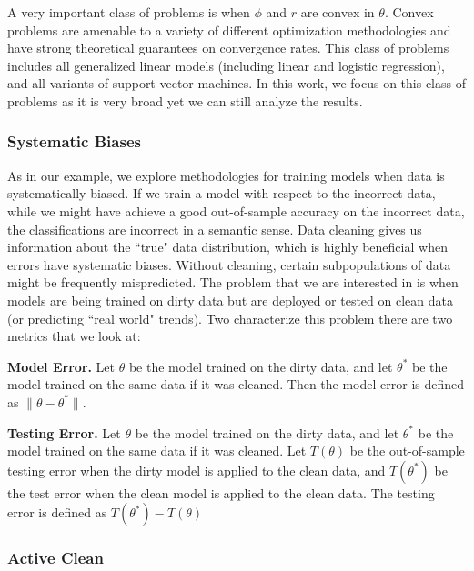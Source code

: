 A very important class of problems is when $\phi$ and $r$ are convex in $\theta$.
Convex problems are amenable to a variety of different optimization methodologies
and have strong theoretical guarantees on convergence rates.
This class of problems includes all generalized linear models (including linear and logistic regression), and all variants of support vector machines.
In this work, we focus on this class of problems as it is very broad yet we can still analyze the results.

\subsubsection{Systematic Biases}
As in our example, we explore methodologies for training models when data is systematically biased.
If we train a model with respect to the incorrect data, while we might have achieve a good out-of-sample accuracy on the incorrect data, the classifications are incorrect in a semantic sense.
Data cleaning gives us information about the ``true" data distribution, which is highly beneficial when errors have systematic biases.
Without cleaning, certain subpopulations of data might be frequently mispredicted. 
The problem that we are interested in is when models are being trained on dirty data but are deployed or tested on clean data (or predicting ``real world" trends).
Two characterize this problem there are two metrics that we look at:

\vspace{0.5em}

\noindent\textbf{Model Error. } Let $\theta$ be the model trained on the dirty data, and let $\theta^*$ be the model trained on the same data if it was cleaned. Then the model error is defined as $\|\theta - \theta^*\|$.

\vspace{0.5em}

\noindent\textbf{Testing Error. } Let $\theta$ be the model trained on the dirty data, and let $\theta^*$ be the model trained on the same data if it was cleaned. Let $T(\theta)$ be the out-of-sample testing error when the dirty model is applied to the clean data, and $T(\theta^*)$ be the test error when the clean model is applied to the clean data. The testing error is defined as $T(\theta^*) - T(\theta)$

\subsubsection{Active Clean}


